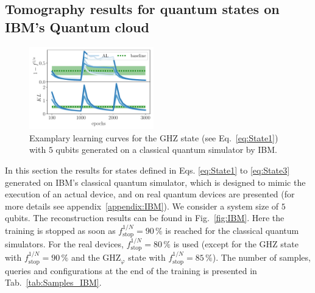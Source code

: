 \documentclass[pra,aps,showpacs,groupedaddress,superscriptaddress,twocolumn,toc=flat,biblatex,footinbib]{revtex4-1}
\begin{document}
\subsection{Tomography results for quantum states on IBM's Quantum cloud \label{sec:States_IBM}}



\begin{figure}[t]
	\centering
  \includegraphics[width=0.48\textwidth]{Fig4.pdf}
	\caption[]{Examplary learning curves for the GHZ state (see Eq.~\eqref{eq:State1}) with $5$ qubits generated on a classical quantum simulator by IBM.}
	\label{fig:Example_GHZIBMclassical}
\end{figure}





In this section the results for states defined in Eqs. \eqref{eq:State1} to \eqref{eq:State3} generated on IBM's classical quantum simulator, which is designed to  mimic the execution of an actual device, and on real quantum devices are presented (for more details see appendix~\ref{appendix:IBM}). We consider a system size of $5$ qubits. The reconstruction results can be found in Fig.~\ref{fig:IBM}. Here the training is stopped as soon as $f^{1/N}_{\mathrm{stop}}=90\,\%$ is reached for the classical quantum simulators. For the real devices, $f^{1/N}_{\mathrm{stop}}=80\,\%$ is used (except for the GHZ state with $f^{1/N}_{\mathrm{stop}}=90\,\%$ and the $\mathrm{GHZ}_\varphi$ state with $f^{1/N}_{\mathrm{stop}}=85\,\%$). The number of samples, queries and configurations at the end of the training is presented in Tab.~\ref{tab:Samples_IBM}.
\end{document}
